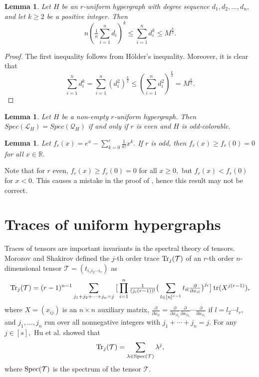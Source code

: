 \documentclass[11pt]{article}
\newtheorem{lemma}[theorem]{Lemma}
\def\Tr{\mathop{\rm Tr }\nolimits}
\def\tr{\mathop{\rm tr }\nolimits}
\def\Spec{\mathop{\rm Spec }\nolimits}
\begin{document}
\noindent\begin{lemma}\label{le:2-3}
 Let $H$ be an $r$-uniform hypergraph with degree sequence $d_{1}, d_{2}, \ldots,d_{n},$ and let $k\geq 2$ be a positive integer. Then $$n(\tfrac{1}{n}\sum_{i=1}^{n}d_{i})^{k}\leq \sum_{i=1}^{n}d_{i}^{k}\leq %
 M^{\frac{k}{2}}.$$
\end{lemma}

\begin{proof}  The first inequality follows from H\"{o}lder's inequality. Moreover, it is clear that $$\sum_{i=1}^{n}d_{i}^{k}=\sum_{i=1}^{n}(d_{i}^{2})^{\frac{k}{2}}\leq (\sum_{i=1}^{n}d_{i}^{2})^{\frac{k}{2}}=M^{\frac{k}{2}}.$$
\end{proof}


\noindent\begin{lemma}\label{le:2-5}\cite{YQSO}
 Let $H$ be a non-empty $r$-uniform hypergraph. Then $Spec(\mathcal{L}_{H}) = Spec(\mathcal{Q}_{H})$ if and only if $r$ is even and $H$ is odd-colorable.
\end{lemma}

\noindent\begin{lemma}\label{le:2-6}
 Let $f_{r}(x)=e^{x}-\sum\limits_{k=0}^{r}\tfrac{1}{k!}x^{k}.$ If $r$ is odd, then $f_{r}(x)\geq f_{r}(0)=0$ for all $x\in \mathbb{R}.$
\end{lemma}
Note that for $r$ even, $f_{r}(x)\geq f_{r}(0)=0$ for all $x\geq 0,$ but $f_{r}(x)<f_{r}(0)$ for $x<0.$ This causes a mistake in the proof of \cite[lower bound Thm.~5]{LSC}, hence this result may not be correct.

\section{Traces of uniform hypergraphs}
\label{sec:ch-inco}

Traces of tensors are important invariants in the spectral theory of tensors. Morozov and Shakirov \cite{MS} defined the $j$-th order trace $\Tr_{j}(\mathcal{T})$ of an $r$-th order $n$-dimensional tensor $\mathcal{T}=(t_{i_{1}i_{2}\cdots i_{r}})$ as $$\Tr_{j}(\mathcal{T})=(r-1)^{n-1}\sum_{j_{1}+j_{2}+\cdots+j_{n}=j}\big[\prod_{i=1}^{n}\tfrac{1}{(j_{i}(r-1))!}\big(\sum_{l \in [n]^{r-1}}t_{il}\tfrac{\partial}{\partial x_{il}}\big)^{j_{i}}\big] \tr (X^{j(r-1)}),$$
where $X = (x_{ij})$ is an $n\times n$ auxiliary matrix, $\frac{\partial}{\partial x_{il}} = \frac{\partial}{\partial x_{il_{2}}}\frac{\partial}{\partial x_{il_{3}}}\cdots \frac{\partial}{\partial x_{il_{r}}}$ if $l = l_{2}\cdots l_{r},$ and  $j_{1}, \ldots, j_{n}$ run over all nonnegative integers with $j_{1} +\cdots+j_{n} =j.$ For any $j\in [s],$ Hu et al. \cite{HHLQ} showed that
$$\Tr_{j}(\mathcal{T})=\sum\limits_{\lambda \in \Spec(\mathcal{T})}\lambda^{j},$$
where $\Spec(\mathcal{T})$ is the spectrum of the tensor $\mathcal{T}.$
\end{document}
